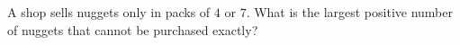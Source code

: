 A shop sells nuggets only in packs of $4$ or $7$. What is the largest positive number of nuggets that cannot be purchased exactly?
